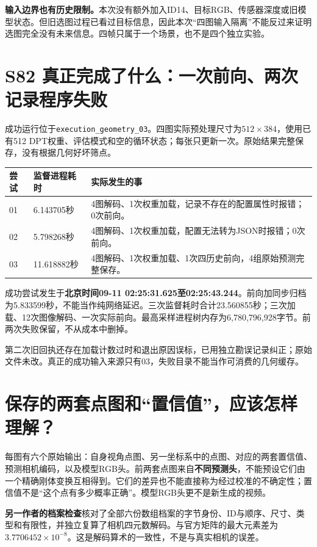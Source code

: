 \documentclass[UTF8,11pt,a4paper]{ctexart}
\begin{document}
\textbf{输入边界也有历史限制。}本次没有额外加入ID14、目标RGB、传感器深度或旧模型状态。但旧选图过程已看过目标信息，因此本次“四图输入隔离”不能反过来证明选图完全没有未来信息。四帧只属于一个场景，也不是四个独立实验。
\clearpage

\section{ S82 真正完成了什么：一次前向、两次记录程序失败}
成功运行位于\texttt{execution\_geometry\_03}。四图实际预处理尺寸为$512\times384$，使用已有512 DPT权重、评估模式和空的循环状态；每张只更新一次。原始结果完整保存，没有根据几何好坏筛点。

\begin{center}\small
\begin{tabular}{p{1.1cm}p{3.0cm}p{10.7cm}}\toprule
尝试&监督进程耗时&实际发生的事\\\midrule
01&6.143705秒&4图解码、1次权重加载，记录不存在的配置属性时报错；0次前向。\\
02&5.798268秒&4图解码、1次权重加载，配置无法转为JSON时报错；0次前向。\\
03&11.618882秒&4图解码、1次权重加载、1次四历史前向，4组原始预测完整保存。\\\bottomrule
\end{tabular}\end{center}

成功尝试发生于\textbf{北京时间09-11 02:25:31.625至02:25:43.244}。前向加同步归档为5.833599秒，不能当作纯网络延迟。三次监督耗时合计23.560855秒；三次加载、12次图像解码、一次实际前向。最高采样进程树内存为6,780,796,928字节。前两次失败保留，不从成本中删掉。

第二次旧回执还存在加载计数过时和退出原因误标，已用独立勘误记录纠正；原始文件未改。真正的成功输入来源只有03，失败目录不能当作可消费的几何缓存。

\section{ 保存的两套点图和“置信值”，应该怎样理解？}
每图有六个原始输出：自身视角点图、另一坐标系中的点图、对应的两套置信值、预测相机编码，以及模型RGB头。前两套点图来自\textbf{不同预测头}，不能预设它们由一个精确刚体变换互相得到。它们的差异也不能直接称为经过校准的不确定性；置信值不是“这个点有多少概率正确”。模型RGB头更不是新生成的视频。

\textbf{另一作者的档案检查}核对了全部六份数组档案的字节身份、ID与顺序、尺寸、类型和有限性，并独立复算了相机四元数解码。与官方矩阵的最大元素差为$3.7706452\times10^{-8}$。这是解码算术的一致性，不是与真实相机的误差。
\end{document}
